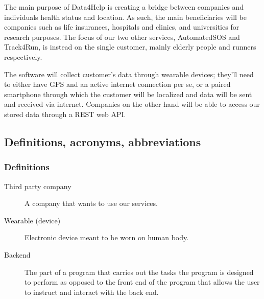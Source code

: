 \documentclass[../main.tex]{subfiles}
\begin{document}
The main purpose of Data4Help is creating a bridge between companies and individuals health status and location. As such, the main beneficiaries will be companies such as life insurances, hospitals and clinics, and universities for research purposes.
The focus of our two other services, AutomatedSOS and Track4Run, is instead on the single customer, mainly elderly people and runners respectively.

The software will collect customer's data through wearable devices; they'll need to either have GPS and an active internet connection per se, or a paired smartphone through which the customer will be localized and data will be sent and received via internet. Companies on the other hand will be able to access our stored data through a REST web API.

%
%
%
%
%

\subsection{Definitions, acronyms, abbreviations}

\subsubsection{Definitions}
\begin{description}

	\item [Third party company] A company that wants to use our services.
	\item [Wearable (device)] Electronic device meant to be worn on human body.
	\item [Backend] The part of a program that carries out the tasks the program is designed to perform as opposed to the front end of the program that allows the user to instruct and interact with the back end.

\end{description}
\end{document}
